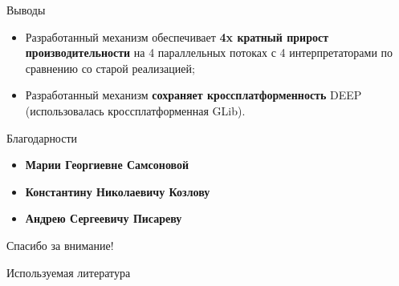 \documentclass{beamer}
\begin{document}
\begin{frame}{Выводы}
\begin{itemize}
    \itemsep 2em
    \item Разработанный механизм обеспечивает
        \textbf{4x кратный прирост производительности}
        на 4 параллельных потоках с 4 интерпретаторами по
        сравнению со старой реализацией;
    \item Разработанный механизм \textbf{сохраняет кроссплатформенность} DEEP
        (использовалась кроссплатформенная GLib).
\end{itemize}
\end{frame}

\begin{frame}{Благодарности}
    \begin{itemize}
        \itemsep 2em
        \item \textbf{Марии Георгиевне Самсоновой}
        \item \textbf{Константину Николаевичу Козлову}
        \item \textbf{Андрею Сергеевичу Писареву}
    \end{itemize}
    \bigskip

    \vfill
    \begin{center}
        \LARGE Спасибо за внимание!
    \end{center}
\end{frame}

\begin{frame}[t,allowframebreaks]{Используемая литература}
    \nocite{Kozlov11, Kozlov13, Storn95, pisarev2015tracker,
    GLib, zaharie2002parameter, fan2003trigonometric}
    
\end{frame}
\end{document}
